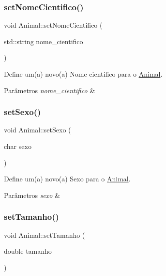 \subsubsection{\texorpdfstring{set\+Nome\+Cientifico()}{setNomeCientifico()}}
{\footnotesize\ttfamily void Animal\+::set\+Nome\+Cientifico (\begin{DoxyParamCaption}\item[{std\+::string}]{nome\+\_\+cientifico }\end{DoxyParamCaption})}



Define um(a) novo(a) Nome científico para o \hyperlink{classAnimal}{Animal}. 


\begin{DoxyParams}{Parâmetros}
{\em nome\+\_\+cientifico} & \\
\hline
\end{DoxyParams}
\mbox{\label{classAnimal_aab32d5ad6689a4e19cfd43a303c939af}} 
\subsubsection{\texorpdfstring{set\+Sexo()}{setSexo()}}
{\footnotesize\ttfamily void Animal\+::set\+Sexo (\begin{DoxyParamCaption}\item[{char}]{sexo }\end{DoxyParamCaption})}



Define um(a) novo(a) Sexo para o \hyperlink{classAnimal}{Animal}. 


\begin{DoxyParams}{Parâmetros}
{\em sexo} & \\
\hline
\end{DoxyParams}
\mbox{\label{classAnimal_a53daf7711c6b6430c723647b2cec7c36}} 
\subsubsection{\texorpdfstring{set\+Tamanho()}{setTamanho()}}
{\footnotesize\ttfamily void Animal\+::set\+Tamanho (\begin{DoxyParamCaption}\item[{double}]{tamanho }\end{DoxyParamCaption})}



